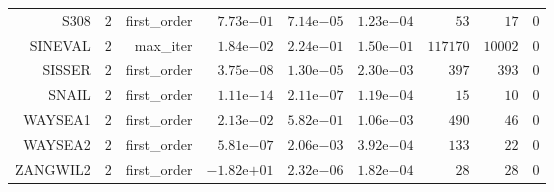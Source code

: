 \begin{longtable}{rrrrrrrrr}
S308 & \(     2\) & first\_order & \( 7.73\)e\(-01\) & \( 7.14\)e\(-05\) & \( 1.23\)e\(-04\) & \(    53\) & \(    17\) & \(     0\) \\
SINEVAL & \(     2\) & max\_iter & \( 1.84\)e\(-02\) & \( 2.24\)e\(-01\) & \( 1.50\)e\(-01\) & \(117170\) & \( 10002\) & \(     0\) \\
SISSER & \(     2\) & first\_order & \( 3.75\)e\(-08\) & \( 1.30\)e\(-05\) & \( 2.30\)e\(-03\) & \(   397\) & \(   393\) & \(     0\) \\
SNAIL & \(     2\) & first\_order & \( 1.11\)e\(-14\) & \( 2.11\)e\(-07\) & \( 1.19\)e\(-04\) & \(    15\) & \(    10\) & \(     0\) \\
WAYSEA1 & \(     2\) & first\_order & \( 2.13\)e\(-02\) & \( 5.82\)e\(-01\) & \( 1.06\)e\(-03\) & \(   490\) & \(    46\) & \(     0\) \\
WAYSEA2 & \(     2\) & first\_order & \( 5.81\)e\(-07\) & \( 2.06\)e\(-03\) & \( 3.92\)e\(-04\) & \(   133\) & \(    22\) & \(     0\) \\
ZANGWIL2 & \(     2\) & first\_order & \(-1.82\)e\(+01\) & \( 2.32\)e\(-06\) & \( 1.82\)e\(-04\) & \(    28\) & \(    28\) & \(     0\) \\\hline
\end{longtable}
